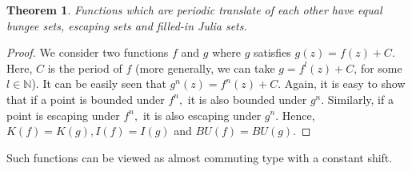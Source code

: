 \documentclass[a4paper,12pt]{amsart}
\newcommand{\N}{\mathbb{N}}
\numberwithin{equation}{section}
\newtheorem{theorem}{Theorem}[section]
\begin{document}
\begin{theorem}
Functions which are periodic translate of each other  have equal bungee sets, escaping sets and filled-in Julia sets.
\end{theorem}
\begin{proof}
We consider two functions $f$ and $g$ where $g$ satisfies $g(z)=f(z)+C.$  Here, $C$ is the period of $f$ (more generally, we can take $g=f^l(z)+C$, for some $l\in\N$). It can be easily seen that $g^{n}(z)=f^{n}(z)+C$. Again, it is easy to show that if a point is bounded under $f^n,$ it is also bounded under $g^n.$ Similarly, if a point  is escaping under $f^n,$ it is also escaping under $g^n$. Hence, $K(f)=K(g), I(f)=I(g)$ and  $BU(f)=BU(g)$.
\end{proof}
Such functions can be viewed as almost commuting type with a constant shift.
\end{document}

